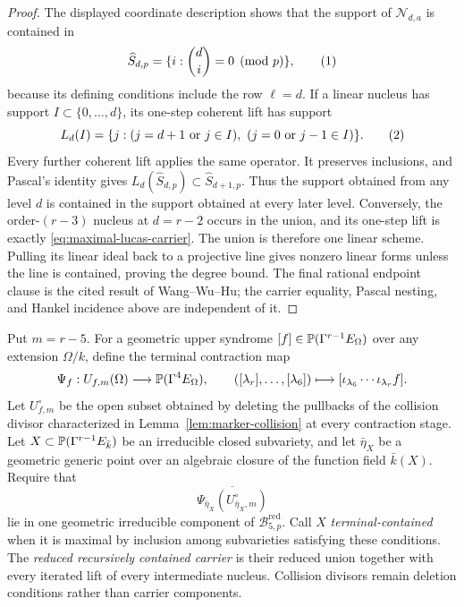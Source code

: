 \begin{proof}
The displayed coordinate description shows that the support of
\(\mathcal N_{d,a}\) is contained in
\[
 \widehat S_{d,p}=\{i:\binom di=0\pmod p\},
 \autoeqtag{eq:lucas-zero-support}
\]
because its defining conditions include the row \(\ell=d\).  If a linear
nucleus has support \(I\subset\{0,\ldots,d\}\), its one-step coherent lift has
support
\[
 L_d(I)=\{j:(j=d+1\text{ or }j\in I),\
                 (j=0\text{ or }j-1\in I)\}.
 \autoeqtag{eq:lucas-support-lift}
\]
Every further coherent lift applies the same operator.  It preserves
inclusions, and Pascal's identity gives
\(L_d(\widehat S_{d,p})\subset\widehat S_{d+1,p}\).
Thus the support obtained from any level \(d\) is contained in the support
obtained at every later level.  Conversely, the order-\((r-3)\) nucleus at
\(d=r-2\) occurs in the union, and its one-step lift is exactly
\eqref{eq:maximal-lucas-carrier}.  The union is therefore one linear scheme.
Pulling its linear ideal back to a projective line gives nonzero linear forms
unless the line is contained, proving the degree bound.  The final rational
endpoint clause is the cited result of Wang--Wu--Hu; the carrier equality,
Pascal nesting, and Hankel incidence above are independent of it.
\end{proof}

\begin{definition}
Put \(m=r-5\).  For a geometric upper syndrome
\([f]\in\mathbb P(\Gamma^{r-1}E_\Omega)\) over any extension \(\Omega/k\), define
the terminal contraction map
\[
\Psi_f:U_{f,m}(\Omega)\longrightarrow\mathbb P(\Gamma^4E_\Omega),\qquad
 ([\lambda_r],\ldots,[\lambda_6])
 \longmapsto[\iota_{\lambda_6}\cdots\iota_{\lambda_r}f].
\]
Let \(U^\circ_{f,m}\) be the open subset obtained by deleting the pullbacks of
the collision divisor characterized in Lemma~\ref{lem:marker-collision} at
every contraction stage.  Let
\(X\subset\mathbb P(\Gamma^{r-1}E_{\bar k})\) be an irreducible closed subvariety,
and let \(\bar\eta_X\) be a geometric generic point over an algebraic closure
of the function field \(\bar k(X)\).  Require that
\[
 \overline{\Psi_{\bar\eta_X}(U^\circ_{\bar\eta_X,m})}
\]
lie in one geometric irreducible component of
\(\mathcal B_{5,p}^{\mathrm{red}}\).  Call \(X\)
\emph{terminal-contained} when it is maximal by inclusion among subvarieties
satisfying these conditions.  The \emph{reduced recursively contained carrier}
is their reduced union together with every iterated lift of every intermediate
nucleus.  Collision divisors remain deletion conditions rather than carrier
components.
\end{definition}

